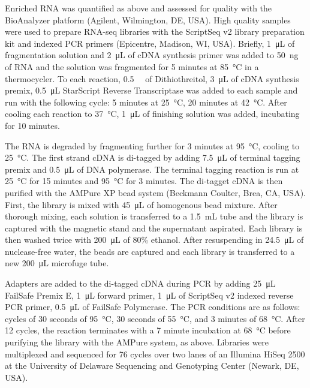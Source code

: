 Enriched RNA was quantified as above and assessed for quality with the BioAnalyzer platform (Agilent, Wilmington, DE, USA). High quality samples were used to prepare RNA-seq libraries with the ScriptSeq v2 library preparation kit and indexed PCR primers (Epicentre, Madison, WI, USA). Briefly, \SI{1}{\micro\liter} of fragmentation solution and \SI{2}{\micro\liter} of cDNA synthesis primer was added to \SI{50}{\nano\gram} of RNA and the solution was fragmented for 5 minutes at \SI{85}{\degreeCelsius} in a thermocycler. To each reaction, \SI{0.5}{\milli\Molar} of Dithiothreitol, \SI{3}{\micro\liter} of cDNA synthesis premix, \SI{0.5}{\micro\liter} StarScript Reverse Transcriptase was added to each sample and run with the following cycle: 5 minutes at \SI{25}{\degreeCelsius}, 20 minutes at \SI{42}{\degreeCelsius}. After cooling each reaction to \SI{37}{\degreeCelsius}, \SI{1}{\micro\liter} of finishing solution was added, incubating for 10 minutes. 

The RNA is degraded by fragmenting further for 3 minutes at \SI{95}{\degreeCelsius}, cooling to \SI{25}{\degreeCelsius}. The first strand cDNA is di-tagged by adding \SI{7.5}{\micro\liter} of terminal tagging premix and \SI{0.5}{\micro\liter} of DNA polymerase. The terminal tagging reaction is run at \SI{25}{\degreeCelsius} for 15 minutes and \SI{95}{\degreeCelsius} for 3 minutes. The di-tagget cDNA is then purified with the AMPure XP bead system (Beckmann Coulter, Brea, CA, USA). First, the library is mixed with \SI{45}{\micro\liter} of homogenous bead mixture. After thorough mixing, each solution is transferred to a \SI{1.5}{\milli\liter} tube and the library is captured with the magnetic stand and the supernatant aspirated. Each library is then washed twice with \SI{200}{\micro\liter} of 80\% ethanol. After resuspending in \SI{24.5}{\micro\liter} of nuclease-free water, the beads are captured and each library is transferred to a new \SI{200}{\micro\liter} microfuge tube. 

Adapters are added to the di-tagged cDNA during PCR by adding \SI{25}{\micro\liter} FailSafe Premix E, \SI{1}{\micro\liter} forward primer, \SI{1}{\micro\liter} of ScriptSeq v2 indexed reverse PCR primer, \SI{0.5}{\micro\liter} of FailSafe Polymerase. The PCR conditions are as follows: cycles of 30 seconds of \SI{95}{\degreeCelsius}, 30 seconds of \SI{55}{\degreeCelsius}, and 3 minutes of \SI{68}{\degreeCelsius}. After 12 cycles, the reaction terminates with a 7 minute incubation at \SI{68}{\degreeCelsius} before purifying the library with the AMPure system, as above.  Libraries were multiplexed and sequenced for 76 cycles over two lanes of an Illumina HiSeq 2500 at the University of Delaware Sequencing and Genotyping Center (Newark, DE, USA).
